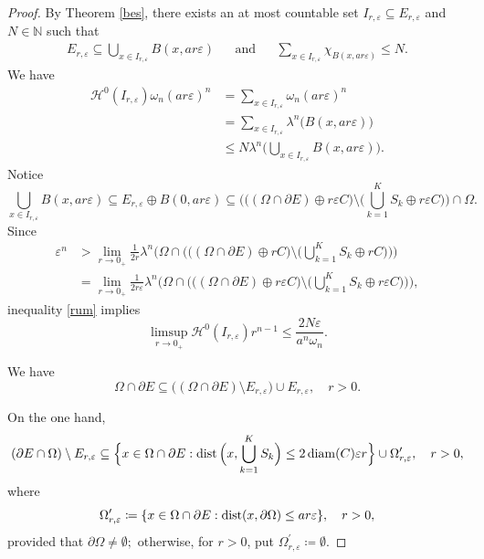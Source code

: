 \documentclass[10pt,a4paper]{amsart}
\DeclareMathOperator{\diam}{\textup{diam}}
\DeclareMathOperator{\dist}{\textup{dist}}
\begin{document}
\begin{proof}
By Theorem \ref{bes}, there exists an at most countable set $I_{r, \varepsilon}\subseteq E_{r, \varepsilon}$ and $N\in\mathbb{N}$ such that
\begin{align}
    E_{r, \varepsilon}\subseteq \bigcup_{x\in I_{r, \varepsilon}} B(x, ar\varepsilon)&&\text{and}&&\sum_{x\in I_{r, \varepsilon}}\chi_{B(x, ar\varepsilon)}\leq N.
\end{align}
We have \begin{equation*}
    \begin{split}
        \mathcal{H}^0(I_{r, \varepsilon})\omega_n (ar\varepsilon)^n&=\sum_{x\in I_{r, \varepsilon}}\omega_n (ar\varepsilon)^n\\&=\sum_{x\in I_{r, \varepsilon}}\lambda^n\big(B(x, ar\varepsilon)\big)\\&\leq N\lambda^n\Big(\bigcup_{x\in I_{r, \varepsilon}}B(x, ar\varepsilon)\Big).
    \end{split}
\end{equation*} 
Notice
\[
\bigcup_{x\in I_{r, \varepsilon}} B(x, ar\varepsilon)\subseteq E_{r, \varepsilon}\oplus B(0, ar\varepsilon) \subseteq \bigg(\big((\Omega\cap\partial E)\oplus r\varepsilon C \big)\setminus \Big(\bigcup_{k=1}^K S_k\oplus r\varepsilon C\Big)\bigg)\cap\Omega.
\]
Since \begin{equation*}\begin{split}
\varepsilon^n&>\lim_{r\to0_+}\frac{1}{2r}\lambda^n\Bigg(\Omega\cap\bigg(\Big((\Omega\cap\partial E)\oplus rC\Big)\setminus\Big(\bigcup_{k=1}^K S_k\oplus rC\Big)\bigg)\Bigg)\\&=\lim_{r\to0_+}\frac{1}{2r\varepsilon}\lambda^n\Bigg(\Omega\cap\bigg(\Big((\Omega\cap\partial E)\oplus r\varepsilon C\Big)\setminus\Big(\bigcup_{k=1}^K S_k\oplus r\varepsilon C\Big)\bigg)\Bigg),
\end{split}
\end{equation*} inequality \eqref{rum} implies
\begin{equation}\label{frf}\limsup_{r\to0_+}\mathcal{H}^0(I_{r, \varepsilon}) r^{n-1}\leq \frac{2N\varepsilon}{a^n\omega_n}.
\end{equation}

We have $$\Omega\cap\partial E\subseteq \big((\Omega\cap\partial E)\setminus E_{r, \varepsilon}\big)\cup E_{r, \varepsilon}, \quad r>0.$$

On the one hand,
\[
(\partial E\cap\Omega)\setminus E_{r, \varepsilon}\subseteq\Big\{x\in \Omega\cap\partial E : \dist\Big(x, \bigcup_{k=1} ^K S_k\Big)\leq 2\diam(C)\varepsilon r\Big\}\cup\Omega^{\prime}_{r, \varepsilon}, \quad r>0,
\] where $$\Omega^{\prime}_{r, \varepsilon}\coloneq\{x\in \Omega\cap\partial E:\dist(x, \partial\Omega)\leq ar\varepsilon\}, \quad r>0,$$ provided that $\partial\Omega\neq\emptyset;$ otherwise, for $r>0$, put $\Omega^{\prime}_{r, \varepsilon}\coloneq\emptyset$.


\end{proof}
\end{document}

